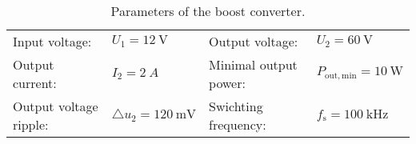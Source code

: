 \begin{table}[ht]
    \centering  %
    \begin{tabular}{llll}
        \toprule
        
        Input voltage: &  $U_{\mathrm{1}} = \SI{12}{\volt}$ & Output voltage: & $U_{\mathrm{2}} = \SI{60}{\volt}$ \\ 
        Output current: & $I_2 = \SI{2}{A}$  & Minimal output power: & $P_{\mathrm{out,min}} = \SI{10}{\watt}$ \\ 
        Output voltage ripple: & $\triangle u_{\mathrm{2}} = \SI{120}{\milli\volt}$  & Swichting frequency: & $f_{\mathrm{s}} = \SI{100}{\kilo\hertz}$ \\ 
        \bottomrule
    \end{tabular}
    \caption{Parameters of the boost converter.}  %
    \label{table:Parameters of the circuit}
\end{table}